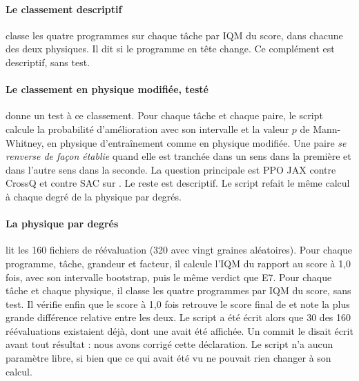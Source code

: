 \paragraph{Le classement descriptif}
 classe les quatre programmes sur chaque tâche par IQM du score, dans chacune des
deux physiques. Il dit si le programme en tête change. Ce complément est descriptif, sans test.

\paragraph{Le classement en physique modifiée, testé}
 donne un test à ce classement. Pour chaque tâche et chaque paire, le script calcule la probabilité d'amélioration avec son intervalle et la valeur $p$ de
Mann-Whitney, en physique d'entraînement comme en physique modifiée. Une paire \emph{se renverse de façon
établie} quand elle est tranchée dans un sens dans la première et dans l'autre sens dans la seconde. La question
principale est PPO JAX contre CrossQ et contre SAC sur . Le reste est descriptif.
Le script refait le même calcul à chaque degré de la physique par degrés.

\paragraph{La physique par degrés}
 lit les 160 fichiers de réévaluation (320 avec vingt graines aléatoires). Pour chaque
programme, tâche, grandeur et facteur, il calcule l'IQM du rapport au score à 1,0 fois, avec son intervalle
bootstrap, puis le même verdict que E7. Pour chaque tâche et chaque physique, il classe les quatre programmes par
IQM du score, sans test. Il vérifie enfin que le score à 1,0 fois retrouve le score final de  et note
la plus grande différence relative entre les deux. Le script a été écrit alors que 30 des 160 réévaluations
existaient déjà, dont une avait été affichée. Un commit le disait écrit avant tout résultat : nous avons
corrigé cette déclaration. Le script n'a aucun paramètre libre, si bien que ce qui avait été vu ne pouvait
rien changer à son calcul.

